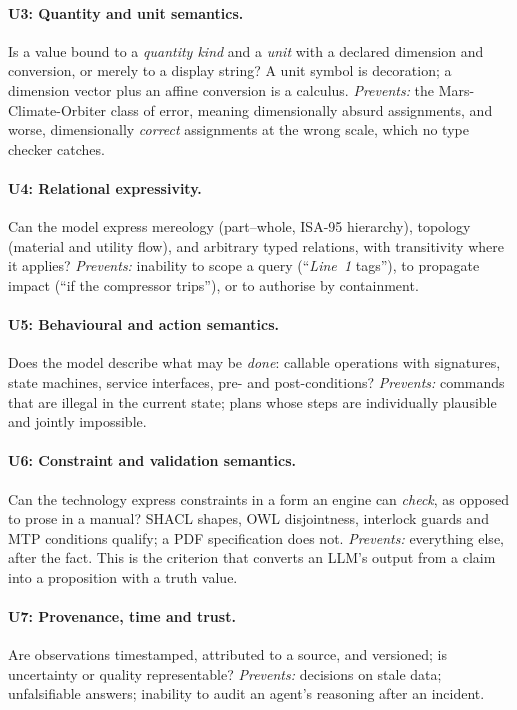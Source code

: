 \paragraph{U3: Quantity and unit semantics.}
Is a value bound to a \emph{quantity kind} and a \emph{unit} with a declared
dimension and conversion, or merely to a display string? A unit symbol is
decoration; a dimension vector plus an affine conversion is a calculus.
\emph{Prevents:} the Mars-Climate-Orbiter class of error, meaning dimensionally
absurd assignments, and worse, dimensionally \emph{correct} assignments at the
wrong scale, which no type checker catches.

\paragraph{U4: Relational expressivity.}
Can the model express mereology (part--whole, ISA-95 hierarchy), topology
(material and utility flow), and arbitrary typed relations, with transitivity
where it applies? \emph{Prevents:} inability to scope a query
(``\emph{Line~1} tags''), to propagate impact (``if the compressor trips''), or
to authorise by containment.

\paragraph{U5: Behavioural and action semantics.}
Does the model describe what may be \emph{done}: callable operations with
signatures, state machines, service interfaces, pre- and post-conditions?
\emph{Prevents:} commands that are illegal in the current state; plans whose
steps are individually plausible and jointly impossible.

\paragraph{U6: Constraint and validation semantics.}
Can the technology express constraints in a form an engine can \emph{check}, as
opposed to prose in a manual? SHACL shapes, OWL disjointness, interlock guards
and MTP conditions qualify; a PDF specification does not. \emph{Prevents:}
everything else, after the fact. This is the criterion that converts an
LLM's output from a claim into a proposition with a truth value.

\paragraph{U7: Provenance, time and trust.}
Are observations timestamped, attributed to a source, and versioned; is
uncertainty or quality representable? \emph{Prevents:} decisions on stale data;
unfalsifiable answers; inability to audit an agent's reasoning after an
incident.

